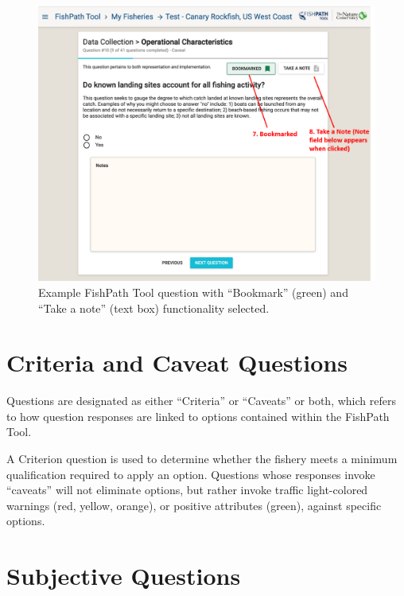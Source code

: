 \documentclass[
  11pt,
]{book}
\begin{document}
\begin{figure}
 
 {\centering \includegraphics[width=0.95\linewidth]{images/bookmark-notes} 
 
 }
 
 \caption{Example FishPath Tool question with “Bookmark” (green) and “Take a note” (text box) functionality selected.}\label{fig:bookmark-notes}
 \end{figure}

\hypertarget{criteria-and-caveat-questions}{%
\section{Criteria and Caveat Questions}\label{criteria-and-caveat-questions}}

Questions are designated as either ``Criteria'' or ``Caveats'' or both, which refers to how question responses are linked to options contained within the FishPath Tool.

A Criterion question is used to determine whether the fishery meets a minimum qualification required to apply an option. Questions whose responses invoke ``caveats'' will not eliminate options, but rather invoke traffic light-colored warnings (red, yellow, orange), or positive attributes (green), against specific options.

\hypertarget{subjective-questions}{%
\section{Subjective Questions}\label{subjective-questions}}
\end{document}
